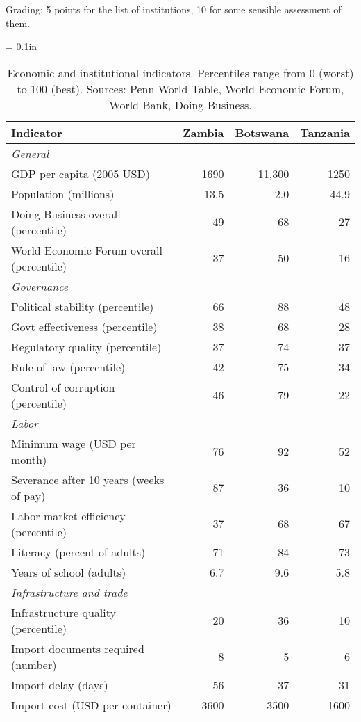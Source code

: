 \documentclass[letterpaper,12pt]{exam}
\begin{document}
\begin{questions}
\begin{solution}
\begin{parts}
\begin{itemize}
\end{itemize}
Grading:  5 points for the list of institutions, 10 for some sensible assessment of them.
\end{parts}
\end{solution}


\begin{table}[h]
\centering
\tabcolsep = 0.1in
\begin{tabular}{lrrr}
\toprule
Indicator & Zambia &  Botswana & Tanzania \\
\midrule
\multicolumn{2}{l}{\it General} \\
GDP per capita  (2005 USD) &  1690  & 11,300 & 1250  \\
Population (millions)      &   13.5 & 2.0 &  44.9   \\
Doing Business overall (percentile) & 49  & 68 & 27 \\
World Economic Forum overall (percentile) & 37 & 50 & 16\\
\midrule
\multicolumn{2}{l}{\it Governance} \\
Political stability (percentile)  &  66 & 88 & 48 \\
Govt effectiveness (percentile)   &  38 & 68 & 28 \\
Regulatory quality (percentile)   &  37 & 74 & 37 \\
Rule of law (percentile)          &  42 & 75 & 34 \\
Control of corruption (percentile)&  46 & 79 & 22 \\
\midrule
\multicolumn{2}{l}{\it Labor} \\
Minimum wage (USD per month) &   76 & 92 & 52 \\
Severance after 10 years (weeks of pay) & 87 & 36 & 10 \\
Labor market efficiency (percentile) & 37 & 68 & 67  \\
Literacy (percent of adults)        & 71 & 84 & 73 \\
Years of school (adults)        & 6.7 & 9.6 & 5.8  \\
\midrule
\multicolumn{2}{l}{\it Infrastructure and trade} \\
Infrastructure quality (percentile)  & 20 & 36 & 10 \\
Import documents required (number) & 8 & 5 & 6\\
Import delay (days) &  56 & 37 & 31  \\
Import cost (USD per container) &  3600 & 3500 & 1600 \\
\bottomrule
\end{tabular}
\caption{Economic and institutional indicators.
Percentiles range from 0 (worst) to 100 (best).
Sources:  Penn World Table, World Economic Forum, World Bank, Doing Business.}
\label{tab:zambia}
\end{table}


\end{questions}
\end{document}
